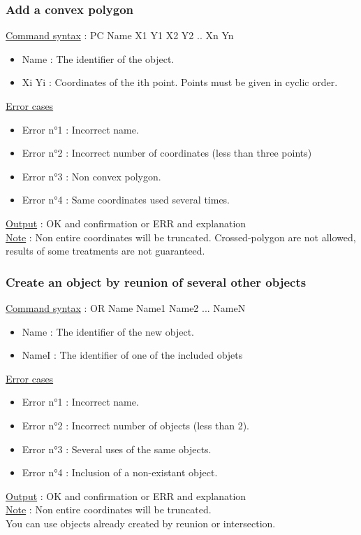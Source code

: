 \documentclass[a4paper, 12pts]{article}
\begin{document}
		\subsubsection{Add a convex polygon}
			\uline{Command syntax} :
			PC Name X1 Y1 X2 Y2 .. Xn Yn
			\begin{itemize}
				\item Name : The identifier of the object.
				\item Xi Yi : Coordinates of the ith point. Points must be given in cyclic order.
			\end{itemize}
			\uline{Error cases}
			\begin{itemize}
				\item Error n°1 : Incorrect name.
				\item Error n°2 : Incorrect number of coordinates (less than three points)
				\item Error n°3 : Non convex polygon.
				\item Error n°4 : Same coordinates used several times.
			\end{itemize}
			\uline{Output} : OK and confirmation or ERR and explanation\\
			\uline{Note} : 
			Non entire coordinates will be truncated.
			Crossed-polygon are not allowed, results of some treatments are not guaranteed.

		\subsubsection{Create an object by reunion of several other objects}
			\uline{Command syntax} :
			OR Name Name1 Name2 ... NameN
			\begin{itemize}
				\item Name : The identifier of the new object.
				\item NameI : The identifier of one of the included objets
			\end{itemize}
			\uline{Error cases}
			\begin{itemize}
				\item Error n°1 : Incorrect name.
				\item Error n°2 : Incorrect number of objects (less than 2).
				\item Error n°3 : Several uses of the same objects.
				\item Error n°4 : Inclusion of a non-existant object.
			\end{itemize}
			\uline{Output} : OK and confirmation or ERR and explanation\\
			\uline{Note} : 
			Non entire coordinates will be truncated.\\
			You can use objects already created by reunion or intersection.
\end{document}

